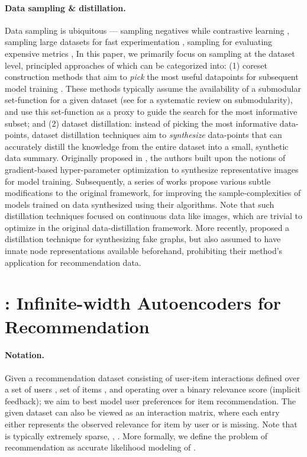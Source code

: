 \documentclass{article}
\begin{document}
\paragraph{Data sampling \& distillation.} Data sampling is ubiquitous --- sampling negatives while contrastive learning \cite{negative_contrastive, negative_contrastive_2}, sampling large datasets for fast experimentation \cite{wsdm22}, sampling for evaluating expensive metrics \cite{sampled_metrics}, \etc In this paper, we primarily focus on sampling at the dataset level, principled approaches of which can be categorized into: (1) coreset construction methods that aim to \emph{pick} the most useful datapoints for subsequent model training \cite{bilevel_coresets, grad_match, selcon_coreset, coreset_scale}. These methods typically assume the availability of a submodular set-function  for a given dataset  (see \cite{bilmes_submodularity} for a systematic review on submodularity), and use this set-function  as a proxy to guide the search for the most informative subset; and (2) dataset distillation: instead of picking the most informative data-points, dataset distillation techniques aim to \emph{synthesize} data-points that can accurately distill the knowledge from the entire dataset into a small, synthetic data summary. Originally proposed in \cite{dd_orig}, the authors built upon the notions of gradient-based hyper-parameter optimization \cite{maclaurin} to synthesize representative images for model training. Subsequently, a series of works \cite{zhao_dc, zhao_dsa, kip, kip_conv} propose various subtle modifications to the original framework, for improving the sample-complexities of models trained on data synthesized using their algorithms. Note that such distillation techniques focused on continuous data like images, which are trivial to optimize in the original data-distillation framework. More recently, \cite{graph_distill} proposed a distillation technique for synthesizing fake graphs, but also assumed to have innate node representations available beforehand, prohibiting their method's application for recommendation data.

\section{\model: Infinite-width Autoencoders for Recommendation} \label{sec:inf_ae}

\paragraph{Notation.} Given a recommendation dataset  consisting of  user-item interactions defined over a set of users , set of items , and operating over a binary relevance score (implicit feedback); we aim to best model user preferences for item recommendation. The given dataset  can also be viewed as an interaction matrix,  where each entry  either represents the observed relevance for item  by user  or is missing. Note that  is typically extremely sparse, \ie, . More formally, we define the problem of recommendation as accurate likelihood modeling of .
\end{document}
